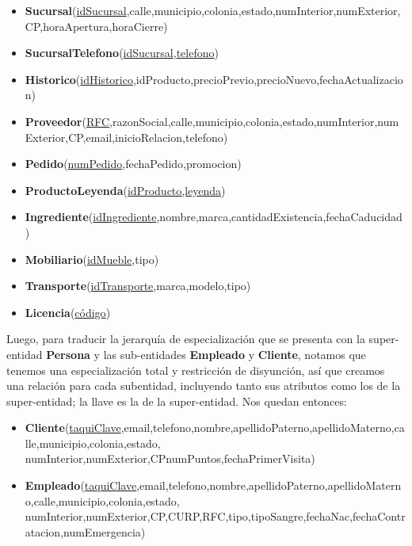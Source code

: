 \documentclass[11pt,letterpaper]{article}
\begin{document}
\begin{itemize}
\item {\footnotesize \textbf{Sucursal}(\underline{idSucursal},calle,municipio,colonia,estado,numInterior,numExterior,CP,horaApertura,horaCierre)}
\item \footnotesize{\textbf{SucursalTelefono}(\underline{idSucursal},\underline{telefono})}
\item \footnotesize{\textbf{Historico}(\underline{idHistorico},idProducto,precioPrevio,precioNuevo,fechaActualizacion)}
\item \scriptsize{\textbf{Proveedor}(\underline{RFC},razonSocial,calle,municipio,colonia,estado,numInterior,numExterior,CP,email,inicioRelacion,telefono)}
\item \footnotesize{\textbf{Pedido}(\underline{numPedido},fechaPedido,promocion)}
\item \footnotesize{\textbf{ProductoLeyenda}(\underline{idProducto,leyenda})}
\item \footnotesize{\textbf{Ingrediente}(\underline{idIngrediente},nombre,marca,cantidadExistencia,fechaCaducidad)}
\item \footnotesize{\textbf{Mobiliario}(\underline{idMueble},tipo)}
\item \footnotesize{\textbf{Transporte}(\underline{idTransporte},marca,modelo,tipo)}
\item \footnotesize{\textbf{Licencia}(\underline{código})}
\end{itemize}

Luego, para traducir la jerarquía de especialización que se presenta con la super-entidad \textbf{Persona} y las sub-entidades \textbf{Empleado} y \textbf{Cliente}, notamos que tenemos una especialización total y restricción de disyunción, así que creamos una relación para cada subentidad, incluyendo tanto sus atributos como los de la super-entidad; la llave es la de la super-entidad. Nos quedan entonces:

\begin{itemize}
\item \footnotesize{\textbf{Cliente}(\underline{taquiClave},email,telefono,nombre,apellidoPaterno,apellidoMaterno,calle,municipio,colonia,estado,
numInterior,numExterior,CPnumPuntos,fechaPrimerVisita)}
\item \footnotesize{\textbf{Empleado}(\underline{taquiClave},email,telefono,nombre,apellidoPaterno,apellidoMaterno,calle,municipio,colonia,estado,
numInterior,numExterior,CP,CURP,RFC,tipo,tipoSangre,fechaNac,fechaContratacion,numEmergencia)}
\end{itemize}
\end{document}
